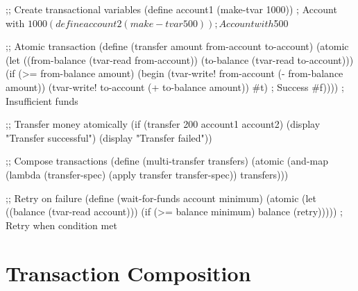 \begin{example}
\begin{lambdustcode}
;; Create transactional variables
(define account1 (make-tvar 1000))    ; Account with $1000
(define account2 (make-tvar 500))     ; Account with $500

;; Atomic transaction  
(define (transfer amount from-account to-account)
  (atomic
    (let ((from-balance (tvar-read from-account))
          (to-balance (tvar-read to-account)))
      (if (>= from-balance amount)
          (begin 
            (tvar-write! from-account (- from-balance amount))
            (tvar-write! to-account (+ to-balance amount))
            #t)    ; Success
          #f))))   ; Insufficient funds

;; Transfer money atomically
(if (transfer 200 account1 account2)
    (display "Transfer successful")
    (display "Transfer failed"))

;; Compose transactions
(define (multi-transfer transfers)
  (atomic 
    (and-map (lambda (transfer-spec)
               (apply transfer transfer-spec))
             transfers)))

;; Retry on failure
(define (wait-for-funds account minimum)
  (atomic
    (let ((balance (tvar-read account)))
      (if (>= balance minimum)
          balance
          (retry)))))    ; Retry when condition met
\end{lambdustcode}
\end{example}

\section{Transaction Composition}
\label{sec:transaction-composition}

